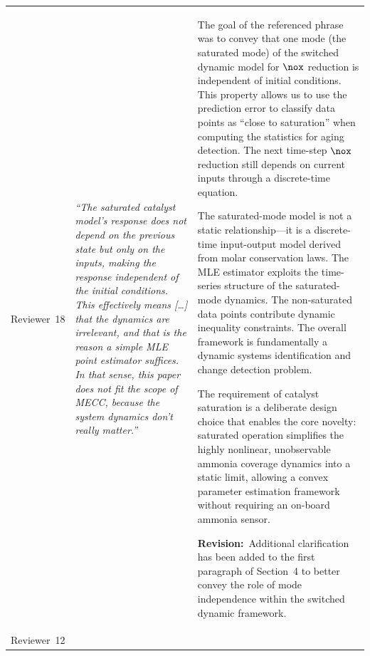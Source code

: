 \documentclass[letterpaper, 10pt]{article}
\newcommand{\rquote}[1]{\textcolor{reviewtext}{\emph{#1}}}
\newcommand{\revision}[1]{\par\smallskip\textcolor{revisioncolor}{\textbf{Revision:}~#1}}
\begin{document}
\begin{longtable}{
    >{\raggedright\arraybackslash\small}p{}
    >{\small}p{}
    >{\small}p{}}
    Reviewer~18
                               &
    \rquote{``The saturated catalyst model's response does not depend on the previous state but only on the inputs,
        making the response independent of the initial conditions. This effectively means [\ldots] that the dynamics are
        irrelevant, and that is the reason a simple MLE point estimator suffices. In that sense, this paper does not fit the
        scope of MECC, because the system dynamics don't really matter.''}
                               &
    The goal of the referenced phrase was to convey that one mode (the saturated mode) of the switched dynamic model for
    $\nox$ reduction is independent of initial conditions. This property allows us to use the prediction error to
    classify data points as ``close to saturation'' when computing the statistics for aging detection. The next time-step
    $\nox$ reduction still depends on current inputs through a discrete-time equation.
    \par\smallskip
    The saturated-mode model is not a static relationship---it is a discrete-time input-output model derived from molar
    conservation laws. The MLE estimator exploits the time-series structure of the saturated-mode dynamics. The
    non-saturated data points contribute dynamic inequality constraints. The overall framework is fundamentally a
    dynamic systems identification and change detection problem.
    \par\smallskip
    The requirement of catalyst saturation is a deliberate design choice that enables the core novelty: saturated
    operation simplifies the highly nonlinear, unobservable ammonia coverage dynamics into a static limit, allowing a
    convex parameter estimation framework without requiring an on-board ammonia sensor.
    \revision{Additional clarification has been added to the first paragraph of Section~4 to better convey the role of
        mode independence within the switched dynamic framework.}
    \\ \arrayrulecolor{rowsep}\midrule\arrayrulecolor{black}
    Reviewer~12
                               &

\end{longtable}
\end{document}
